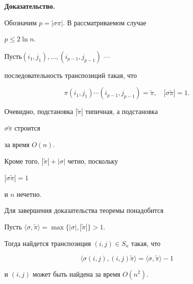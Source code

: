 {\bf Доказательство.}


Обозначим $p = |\sigma \pi|$. В рассматриваемом случае


$p \le 2 \ln n$.


Пусть\linebreak $(i_1,j_1), \dotsc, (i_{p-1},j_{p-1})$ ---


последовательность транспозиций такая, что


\begin{equation}


\label {e9}


\pi(i_1,j_1) \dotsb (i_{p-1}, j_{p-1}) = \widetilde{\pi},\quad


|\sigma \widetilde{\pi}| = 1.


\end{equation}


Очевидно, подстановка $|\widetilde{\pi}|$ типичная, а подстановка


$\sigma \widetilde{\pi}$ строится


за время $O(n)$. 


Кроме того, $|\widetilde{\pi}| + |\sigma|$ четно, поскольку 


$|\sigma \widetilde{\pi}| = 1$


и $n$ нечетно. 





Для завершения доказательства теоремы понадобится





\begin{lem}


\label{lm4}


Пусть $\langle\sigma, \widetilde{\pi}\rangle = 


\max \{|\sigma|, |\widetilde{\pi}|\} > 1$.


Тогда найдется транспозиция $ (i,j) \in S_n$ такая, что


\begin{equation}


\label {e8}


\langle\sigma (i,j), (i,j) \widetilde{\pi}\rangle =


\langle\sigma, \widetilde{\pi}\rangle - 1 


\end{equation}


и $(i,j)$ может быть найдена за время $O(n^2)$.


\end{lem}





